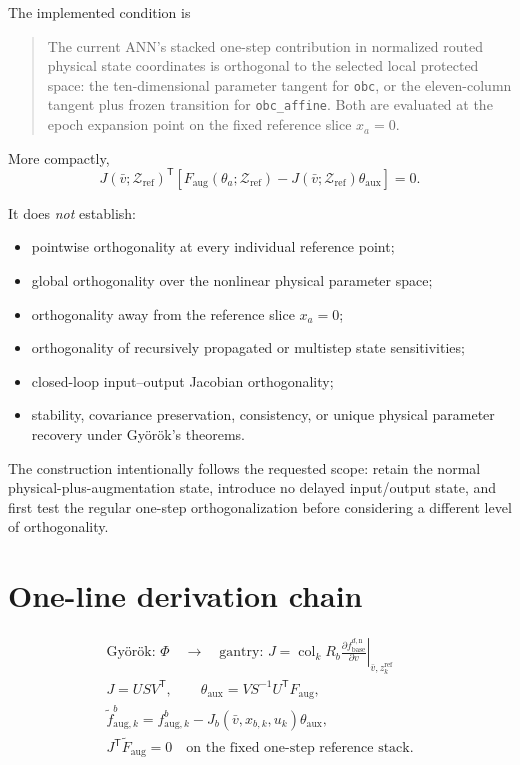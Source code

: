 \documentclass[11pt,a4paper]{article}
\newcommand{\col}{\operatorname{col}}
\newcommand{\T}{\mathsf{T}}
\newcommand{\code}[1]{\texttt{#1}}
\begin{document}
The implemented condition is
\begin{quote}
The current ANN's stacked one-step contribution in normalized routed physical
state coordinates is orthogonal to the selected local protected space: the
ten-dimensional parameter tangent for \code{obc}, or the eleven-column tangent
plus frozen transition for \code{obc\_affine}. Both are evaluated at the epoch
expansion point on the fixed reference slice \(x_a=0\).
\end{quote}

More compactly,
\begin{equation}
\boxed{
J(\bar v;\mathcal Z_{\mathrm{ref}})^\T
\left[
F_{\mathrm{aug}}(\theta_a;\mathcal Z_{\mathrm{ref}})
-J(\bar v;\mathcal Z_{\mathrm{ref}})\theta_{\mathrm{aux}}
\right]=0.
}
\end{equation}

It does \emph{not} establish:
\begin{itemize}
\item pointwise orthogonality at every individual reference point;
\item global orthogonality over the nonlinear physical parameter space;
\item orthogonality away from the reference slice \(x_a=0\);
\item orthogonality of recursively propagated or multistep state sensitivities;
\item closed-loop input--output Jacobian orthogonality;
\item stability, covariance preservation, consistency, or unique physical
      parameter recovery under Gy\"or\"ok's theorems.
\end{itemize}

The construction intentionally follows the requested scope: retain the normal
physical-plus-augmentation state, introduce no delayed input/output state, and
first test the regular one-step orthogonalization before considering a
different level of orthogonality.

\section{One-line derivation chain}

\begin{equation}
\boxed{
\begin{gathered}
\text{Gy\"or\"ok: }\Phi
\quad\longrightarrow\quad
\text{gantry: }J
=\col_k R_b
\left.\frac{\partial f_{\mathrm{base}}^{d,\mathrm n}}
{\partial v}\right|_{\bar v,z_k^{\mathrm{ref}}}
\\[1mm]
J=USV^\T,
\qquad
\theta_{\mathrm{aux}}=VS^{-1}U^\T F_{\mathrm{aug}},
\\[1mm]
\widetilde f_{\mathrm{aug},k}^b
=f_{\mathrm{aug},k}^b
-J_b(\bar v,x_{b,k},u_k)\theta_{\mathrm{aux}},
\\[1mm]
J^\T\widetilde F_{\mathrm{aug}}=0
\quad\text{on the fixed one-step reference stack.}
\end{gathered}}
\end{equation}
\end{document}
